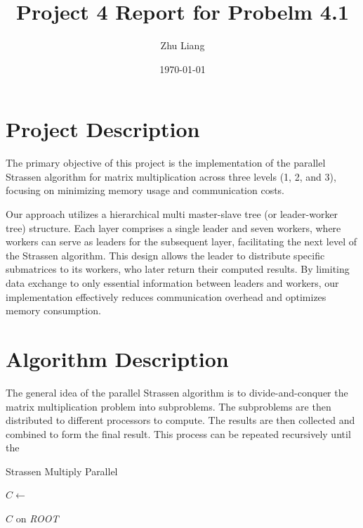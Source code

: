 \documentclass[12pt,a4paper]{article}
\title{Project 4 Report for Probelm 4.1}
\author{Zhu Liang}
\date{\today}
\begin{document}
\maketitle

\section{Project Description}
The primary objective of this project is the implementation of the parallel Strassen algorithm for matrix multiplication across three levels (1, 2, and 3), focusing on minimizing memory usage and communication costs.

Our approach utilizes a hierarchical multi master-slave tree (or leader-worker tree) structure. 
Each layer comprises a single leader and seven workers, where workers can serve as leaders for the subsequent layer, 
 facilitating the next level of the Strassen algorithm. 
This design allows the leader to distribute specific submatrices to its workers, 
 who later return their computed results. 
By limiting data exchange to only essential information between leaders and workers, 
 our implementation effectively reduces communication overhead and optimizes memory consumption.


\section{Algorithm Description}
The general idea of the parallel Strassen algorithm is to divide-and-conquer the matrix multiplication problem into subproblems. 
The subproblems are then distributed to different processors to compute.
The results are then collected and combined to form the final result.
This process can be repeated recursively until the 

\begin{algorithm}[htbp]
    \caption{Strassen Multiply Parallel}
    \label{alg:strassen_multiply_parallel}
    \begin{algorithmic}[1]

            \State {}  
        \EndFor
        
        \State $C \gets$ 
        
            \State {}
        \EndFor
        
        \State \Return $C$ on \textit{ROOT}
    \EndProcedure
    \end{algorithmic}
\end{algorithm}
\end{document}
